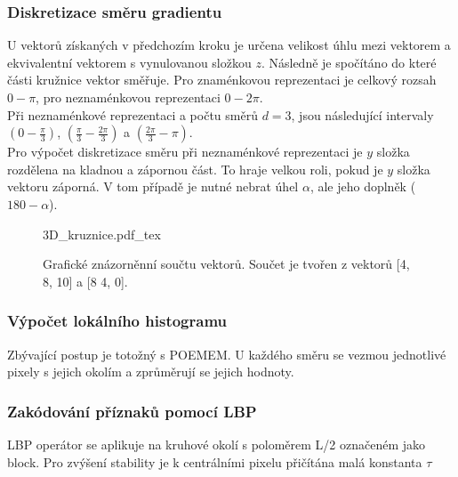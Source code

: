\documentclass[czech,BP]{thesiskiv}
\begin{document}
\subsubsection{Diskretizace směru gradientu}
U vektorů získaných v předchozím kroku je určena velikost úhlu mezi vektorem a ekvivalentní vektorem s vynulovanou složkou $z$. Následně je spočítáno do které části kružnice vektor směřuje. Pro znaménkovou reprezentaci je celkový rozsah $0 - \pi$, pro neznaménkovou reprezentaci $0 - 2\pi$.
\\
Při neznaménkové reprezentaci a počtu směrů $d = 3$, jsou následující intervaly $\left(0 - \frac{\pi}{3}\right)$, $\left(\frac{\pi}{3} - \frac{2\pi}{3}\right)$ a  $\left(\frac{2\pi}{3} - \pi\right)$.
\\
Pro výpočet diskretizace směru při neznaménkové reprezentaci je $y$ složka rozdělena na kladnou a zápornou část. To hraje velkou roli, pokud je $y$ složka vektoru záporná. V tom případě je nutné nebrat úhel $\alpha$, ale jeho doplněk ($ 180 - \alpha$).

\begin{figure}[H]
    \centering
    \def\svgwidth{\columnwidth}
    {3D_kruznice.pdf_tex} 
    \caption{Grafické znázorněnní součtu vektorů. Součet je tvořen z vektorů [4, 8, 10] a [8 4, 0].}
\end{figure}

\subsubsection{Výpočet lokálního histogramu}
\par Zbývající postup je totožný s POEMEM. U každého směru se vezmou jednotlivé pixely s jejich okolím a zprůměrují se jejich hodnoty. 

\subsubsection{Zakódování příznaků pomocí LBP}
\par LBP operátor se aplikuje na kruhové okolí s poloměrem L/2 označeném jako block. Pro zvýšení stability je k centrálními pixelu přičítána malá konstanta $\tau$ 
\end{document}
